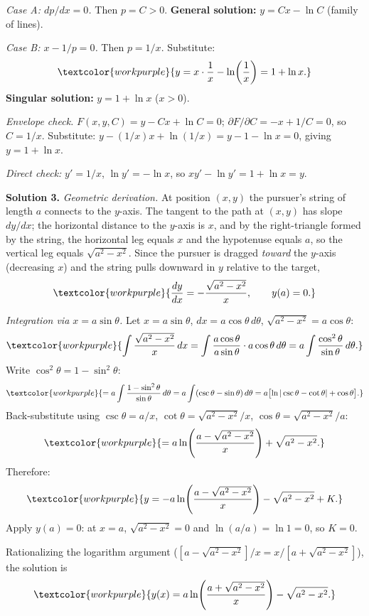 \textit{Case A: $dp/dx = 0$.}
Then $p = C > 0$.
\textbf{General solution:} $y = Cx - \ln C$ (family of lines).

\textit{Case B: $x - 1/p = 0$.}
Then $p = 1/x$. Substitute:
\[
  \textcolor{workpurple}{y = x\cdot\frac{1}{x} - \ln\!\left(\frac{1}{x}\right)
  = 1 + \ln x.}
\]
\textbf{Singular solution:} $y = 1 + \ln x$ ($x > 0$).

\textit{Envelope check.}
$F(x,y,C) = y - Cx + \ln C = 0$; $\partial F/\partial C = -x + 1/C = 0$,
so $C = 1/x$.
Substitute: $y - (1/x)x + \ln(1/x) = y - 1 - \ln x = 0$, giving
$y = 1 + \ln x$. \checkmark

\textit{Direct check:} $y' = 1/x$, $\ln y' = -\ln x$, so
$xy' - \ln y' = 1 + \ln x = y$. \checkmark

\medskip

\noindent\textbf{Solution 3.}\quad
\textit{Geometric derivation.}
At position $(x,y)$ the pursuer's string of length $a$ connects to the
$y$-axis. The tangent to the path at $(x,y)$ has slope $dy/dx$; the
horizontal distance to the $y$-axis is $x$, and by the right-triangle
formed by the string, the horizontal leg equals $x$ and the hypotenuse
equals $a$, so the vertical leg equals $\sqrt{a^2 - x^2}$.
Since the pursuer is dragged \emph{toward} the $y$-axis (decreasing $x$)
and the string pulls downward in $y$ relative to the target,
\[
  \textcolor{workpurple}{\frac{dy}{dx} = -\frac{\sqrt{a^2 - x^2}}{x},
  \qquad y(a) = 0.}
\]

\textit{Integration via $x = a\sin\theta$.}
Let $x = a\sin\theta$, $dx = a\cos\theta\,d\theta$,
$\sqrt{a^2 - x^2} = a\cos\theta$:
\[
  \textcolor{workpurple}{\int\frac{\sqrt{a^2-x^2}}{x}\,dx
  = \int\frac{a\cos\theta}{a\sin\theta}\cdot a\cos\theta\,d\theta
  = a\int\frac{\cos^2\theta}{\sin\theta}\,d\theta.}
\]
Write $\cos^2\theta = 1 - \sin^2\theta$:
\[
  \textcolor{workpurple}{= a\int\frac{1 - \sin^2\theta}{\sin\theta}\,d\theta
  = a\int(\csc\theta - \sin\theta)\,d\theta
  = a\bigl[\ln|\csc\theta - \cot\theta| + \cos\theta\bigr].}
\]
Back-substitute using $\csc\theta = a/x$,
$\cot\theta = \sqrt{a^2-x^2}/x$,
$\cos\theta = \sqrt{a^2-x^2}/a$:
\[
  \textcolor{workpurple}{= a\ln\!\left(\frac{a - \sqrt{a^2-x^2}}{x}\right)
  + \sqrt{a^2-x^2}.}
\]
Therefore:
\[
  \textcolor{workpurple}{y = -a\ln\!\left(\frac{a - \sqrt{a^2-x^2}}{x}\right)
  - \sqrt{a^2-x^2} + K.}
\]
Apply $y(a) = 0$: at $x = a$, $\sqrt{a^2-x^2} = 0$ and $\ln(a/a) = \ln 1 = 0$,
so $K = 0$.

Rationalizing the logarithm argument
($[a - \sqrt{a^2-x^2}]/x = x/[a + \sqrt{a^2-x^2}]$), the solution is
\[
  \textcolor{workpurple}{y(x) = a\ln\!\left(\frac{a + \sqrt{a^2 - x^2}}{x}\right)
  - \sqrt{a^2 - x^2}.}
\]

